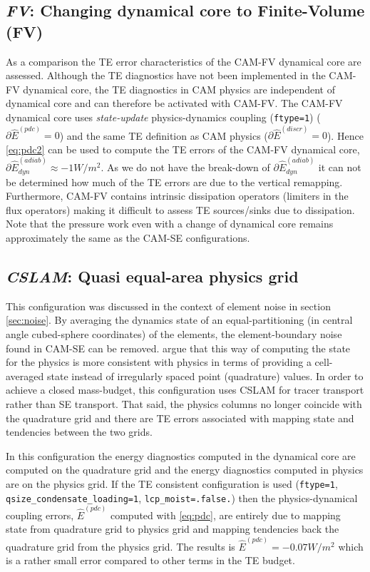 \documentclass[draft,linenumbers]{agujournal}
\newcommand*{\gi}[1]{\widehat{#1}}
\begin{document}
\subsection{{\em{FV}}: Changing dynamical core to Finite-Volume (FV)}\label{sec:cam-fv}
As a comparison the TE error characteristics of the CAM-FV dynamical core are assessed. Although the TE diagnostics have not been implemented in the CAM-FV dynamical core, the TE diagnostics in CAM physics are independent of dynamical core and can therefore be activated with CAM-FV. The CAM-FV dynamical core uses {\em{state-update}} physics-dynamics coupling ({\tt{ftype=1}}) ($\partial \gi{E}^{(pdc)}=0$) and the same TE definition as CAM physics ($\partial \gi{E}^{(discr)}=0$). Hence \eqref{eq:pdc2} can be used to compute the TE errors of the CAM-FV dynamical core, $\partial \gi{E}^{(adiab)}_{dyn}\approx -1 W/m^2$. As we do not have the break-down of $\partial \gi{E}^{(adiab)}_{dyn}$ it can not be determined how much of the TE errors are due to the vertical remapping. Furthermore, CAM-FV contains intrinsic dissipation operators (limiters in the flux operators) making it difficult to assess TE sources/sinks due to dissipation. Note that the pressure work {\color{red}{error}} even with a change of dynamical core remains approximately the same as the CAM-SE configurations.
\subsection{{\em{CSLAM}}: Quasi equal-area physics grid}\label{sec:cslam}
This configuration was discussed in the context of element noise in section \ref{sec:noise}. By averaging the dynamics state of an equal-partitioning (in central angle cubed-sphere coordinates) of the elements, the element-boundary noise found in CAM-SE can be removed. \cite{LetAl2018JAMES} argue that this way of computing the state for the physics is more consistent with physics in terms of providing a cell-averaged state instead of irregularly spaced point (quadrature) values. In order to achieve a closed mass-budget, this configuration uses CSLAM for tracer transport rather than SE transport. That said, the physics columns no longer coincide with the quadrature grid and there are TE errors associated with mapping state and tendencies between the two grids.

In this configuration the energy diagnostics computed in the dynamical core are computed on the quadrature grid and the energy diagnostics computed in physics are on the physics grid. If the TE consistent configuration is used ({\tt{ftype=1}}, {\tt{qsize\_condensate\_loading=1}}, {\tt{lcp\_moist=.false.}}) then the physics-dynamical coupling errors, $\gi{E}^{(pdc)}$ computed with \eqref{eq:pdc}, are entirely due to mapping state from quadrature grid to physics grid and mapping tendencies back the quadrature grid from the physics grid. The results is $\gi{E}^{(pdc)}=-0.07W/m^2$ which is a rather small error compared to other terms in the TE budget.
\end{document}

